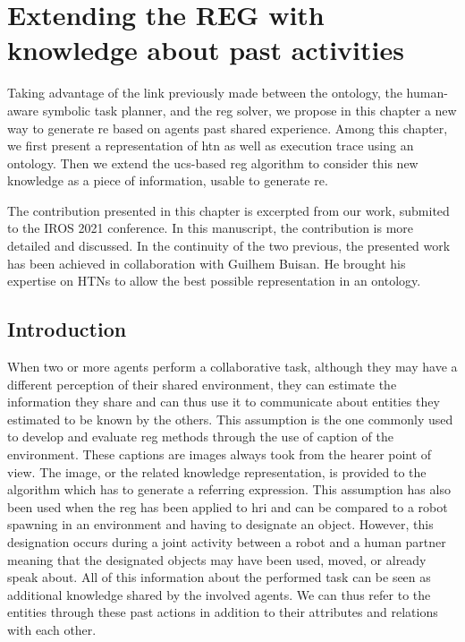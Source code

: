 \ifdefined{}
\else
\setcounter{chapter}{6} %
\dominitoc
\faketableofcontents
\fi

\chapter{Extending the REG with knowledge about past activities}
\minitoc
\label{chap:6}

Taking advantage of the link previously made between the ontology, the human-aware symbolic task planner, and the \acrshort{reg} solver, we propose in this chapter a new way to generate \acrlong{re} based on agents past shared experience. Among this chapter, we first present a representation of \acrshort{htn} as well as execution trace using an ontology. Then we extend the \acrshort{ucs}-based \acrshort{reg} algorithm to consider this new knowledge as a piece of information, usable to generate \acrlong{re}.

The contribution presented in this chapter is excerpted from our work, submited to the IROS 2021 conference. In this manuscript, the contribution is more detailed and discussed. In the continuity of the two previous, the presented work has been achieved in collaboration with Guilhem Buisan. He brought his expertise on HTNs to allow the best possible representation in an ontology.

\section{Introduction}

When two or more agents perform a collaborative task, although they may have a different perception of their shared environment, they can estimate the information they share and can thus use it to communicate about entities they estimated to be known by the others. This assumption is the one commonly used to develop and evaluate \acrfull{reg} methods through the use of caption of the environment\cite{duboue_2015_evaluating}. These captions are images always took from the hearer point of view. The image, or the related knowledge representation, is provided to the algorithm which has to generate a referring expression. This assumption has also been used when the \acrshort{reg} has been applied to \acrfull{hri} and can be compared to a robot spawning in an environment and having to designate an object. However, this designation occurs during a joint activity between a robot and a human partner meaning that the designated objects may have been used, moved, or already speak about. All of this information about the performed task can be seen as additional knowledge shared by the involved agents. We can thus refer to the entities through these past actions in addition to their attributes and relations with each other.

